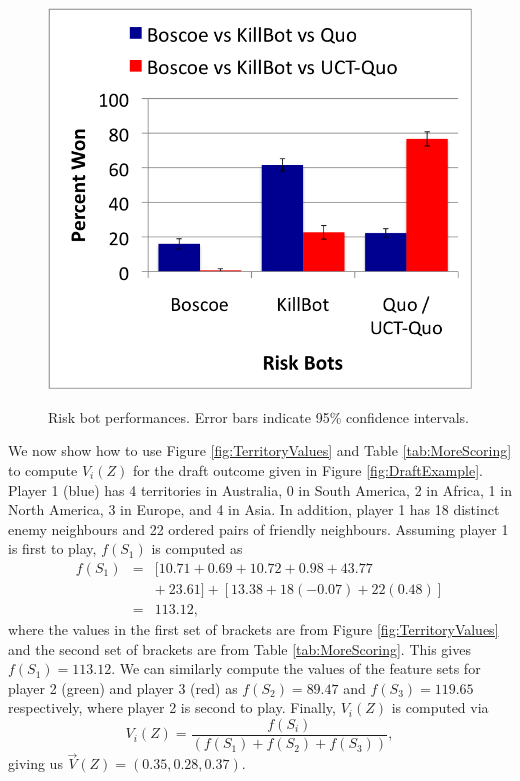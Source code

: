 \documentclass[letterpaper]{article}
\numberwithin{equation}{section}
\numberwithin{theorem}{section}
\numberwithin{lemma}{section}
\numberwithin{df}{section}
\begin{document}
\begin{figure}[t]
{		\includegraphics[scale=.45]{BoscoeKillQuo.png}
		\label{fig:BoscoeKillBotQuo}
	}
	\caption[]{Risk bot performances.  Error bars indicate 95\% confidence intervals.}
	\label{fig:RiskResults}
\end{figure}

We now show how to use Figure \ref{fig:TerritoryValues} and Table \ref{tab:MoreScoring} to compute $V_i(Z)$ for the draft outcome given in Figure \ref{fig:DraftExample}.  Player 1 (blue) has 4 territories in Australia, 0 in South America, 2 in Africa, 1 in North America, 3 in Europe, and 4 in Asia.  In addition, player 1 has 18 distinct enemy neighbours and 22 ordered pairs of friendly neighbours.  Assuming player 1 is first to play, $f(S_1)$ is computed as
\begin{eqnarray*}
 	f(S_1) &=& [10.71 + 0.69 + 10.72 + 0.98 + 43.77 \\ &&+\ 23.61] + [13.38 + 18(-0.07) + 22(0.48)] \\
 				 &=& 113.12,
\end{eqnarray*}
where the values in the first set of brackets are from Figure \ref{fig:TerritoryValues} and the second set of brackets are from Table \ref{tab:MoreScoring}.  This gives $f(S_1) = 113.12$.  We can similarly compute the values of the feature sets for player 2 (green) and player 3 (red) as %
$f(S_2) = 89.47$ and $f(S_3) = 119.65$ respectively, where player 2 is second to play.  Finally, $V_i(Z)$ is computed via %
\[ V_i(Z) = \frac{f(S_i)}{\left(f(S_1) + f(S_2) + f(S_3) \right)}, \]
giving us %
$\vec{V}(Z) = (0.35, 0.28, 0.37)$.
\end{document}
